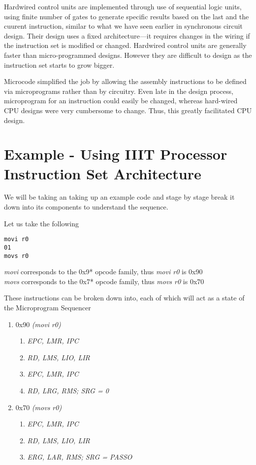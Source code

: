 Hardwired control units are implemented through use of sequential logic units, using finite number of gates to generate specific results based on the last and the cuurent instruction, similar to what we have seen earlier in synchronous circuit design. Their design uses a fixed architecture—it requires changes in the wiring if the instruction set is modified or changed. Hardwired control units are generally faster than micro-programmed designs. However they are difficult to design as the instruction set starts to grow bigger. 

Microcode simplified the job by allowing the assembly instructions to be defined via microprograms rather than by circuitry. Even late in the design process, microprogram for an instruction could easily be changed, whereas hard-wired CPU designs were very cumbersome to change. Thus, this greatly facilitated CPU design.

\clearpage

\section{Example - Using IIIT Processor Instruction Set Architecture}

We will be taking an taking up an example code and stage by stage break it down into its components to understand the sequence.

Let us take the following
\begin{verbatim}    
movi r0
01
movs r0
\end{verbatim}
\textit{movi} corresponds to the 0x9* opcode family, thus \textit{movi r0} is 0x90 \\
\textit{movs} corresponds to the 0x7* opcode family, thus \textit{movs r0} is 0x70


These instructions can be broken down into, each of which will act as a state of the Microprogram Sequencer
\begin{enumerate}
\item 0x90 \textit{(movi r0)}
    \begin{enumerate}
    \item \textit{EPC, LMR, IPC}
    \item \textit{RD, LMS, LIO, LIR}
    \item \textit{EPC, LMR, IPC}
    \item \textit{RD, LRG, RMS; SRG = 0} 
    \end{enumerate}
\item 0x70 \textit{(movs r0)}
    \begin{enumerate}
    \item \textit{EPC, LMR, IPC}
    \item \textit{RD, LMS, LIO, LIR}
    \item \textit{ERG, LAR, RMS; SRG = PASSO}
    \end{enumerate}
\end{enumerate}

